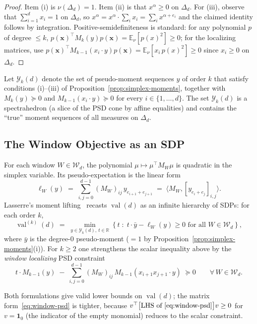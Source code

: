 \documentclass[11pt, letterpaper]{article}
\theoremstyle{paperplain}
\theoremstyle{paperdef}
\newcommand{\R}{\mathbb{R}}
\newcommand{\E}{\mathbb{E}}
\newcommand{\val}{\operatorname{val}}
\newcommand{\PSD}{\succeq 0}
\begin{document}
\begin{proof}
Item (i) is $\nu(\Delta_d)=1$.  Item (ii) is that $x^\alpha\ge 0$ on
$\Delta_d$.  For (iii), observe that
$\sum_{i=1}^d x_i = 1$ on $\Delta_d$, so
$x^\alpha = x^\alpha\cdot\sum_i x_i = \sum_i x^{\alpha+e_i}$ and the
claimed identity follows by integration.  Positive-semidefiniteness
is standard: for any polynomial $p$ of degree $\le k$,
$p(\mathbf{x})^\top M_k(y) p(\mathbf{x}) = \E_\nu[p(x)^2]\ge 0$; for
the localizing matrices, use $p(\mathbf{x})^\top
M_{k-1}(x_i\cdot y)p(\mathbf{x}) = \E_\nu[x_i\,p(x)^2]\ge 0$ since
$x_i\ge 0$ on $\Delta_d$.
\end{proof}

Let $\mathcal{Y}_k(d)$ denote the set of pseudo-moment sequences $y$ of
order $k$ that satisfy conditions (i)--(iii) of
Proposition~\ref{prop:simplex-moments}, together with $M_k(y)\PSD$
and $M_{k-1}(x_i\cdot y)\PSD$ for every $i\in\{1,\ldots,d\}$.  The set
$\mathcal{Y}_k(d)$ is a spectrahedron (a slice of the PSD cone by
affine equalities) and contains the ``true'' moment sequences of all
measures on $\Delta_d$.

\subsection{The Window Objective as an SDP}\label{subsec:window-psd}

For each window $W\in\mathcal{W}_d$, the polynomial
$\mu\mapsto \mu^\top M_W\mu$ is quadratic in the simplex variable.  Its
pseudo-expectation is the linear form
\[
  \ell_W(y)
  \;=\;
  \sum_{i,j=0}^{d-1} (M_W)_{ij}\,y_{e_{i+1}+e_{j+1}}
  \;=\;
  \langle M_W, [y_{e_i+e_j}]_{i,j}\rangle.
\]
Lasserre's moment lifting~\cite[Thm.~4.2]{Lasserre2001} recasts
$\val(d)$ as an infinite hierarchy of SDPs: for each order $k$,
\[
  \val^{(k)}(d)
  \;=\;
  \min_{y\in\mathcal{Y}_k(d),\ t\in\R}
  \left\{
    t
    \;:\;
    t\cdot \bar y - \ell_W(y) \ge 0
    \text{ for all } W\in\mathcal{W}_d
  \right\},
\]
where $\bar y$ is the degree-$0$ pseudo-moment ($=1$ by
Proposition~\ref{prop:simplex-moments}(i)).  For $k\ge 2$ one
strengthens the scalar inequality above by the \emph{window
localizing} PSD constraint
\begin{equation}\label{eq:window-psd}
  t\cdot M_{k-1}(y)
  \;-\;
  \sum_{i,j=0}^{d-1}(M_W)_{ij}\,M_{k-1}(x_{i+1}x_{j+1}\cdot y)
  \;\PSD
  \qquad
  \forall\, W\in\mathcal{W}_d.
\end{equation}

Both formulations give valid lower bounds on $\val(d)$; the matrix
form~\eqref{eq:window-psd} is tighter, because $v^\top \bigl[\text{LHS
of }\eqref{eq:window-psd}\bigr] v\ge 0$ for $v=\mathbf{1}_0$ (the
indicator of the empty monomial) reduces to the scalar constraint.
\end{document}
